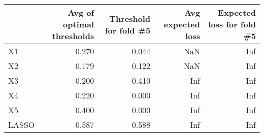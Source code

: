 
\begin{tabular}{lrrrr}
\toprule
  & Avg of optimal thresholds & Threshold for fold \#5 & Avg expected loss & Expected loss for fold \#5\\
\midrule
X1 & 0.270 & 0.044 & NaN & Inf\\
X2 & 0.179 & 0.122 & NaN & Inf\\
X3 & 0.200 & 0.410 & Inf & Inf\\
X4 & 0.220 & 0.000 & Inf & Inf\\
X5 & 0.400 & 0.000 & Inf & Inf\\
LASSO & 0.587 & 0.588 & Inf & Inf\\
\bottomrule
\end{tabular}